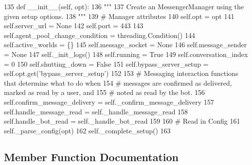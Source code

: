 \begin{DoxyCode}
135     \textcolor{keyword}{def }\_\_init\_\_(self, opt):
136         \textcolor{stringliteral}{"""}
137 \textcolor{stringliteral}{        Create an MessengerManager using the given setup options.}
138 \textcolor{stringliteral}{        """}
139         \textcolor{comment}{# Manager attributes}
140         self.opt = opt
141         self.server\_url = \textcolor{keywordtype}{None}
142         self.port = 443
143         self.agent\_pool\_change\_condition = threading.Condition()
144         self.active\_worlds = \{\}
145         self.message\_socket = \textcolor{keywordtype}{None}
146         self.message\_sender = \textcolor{keywordtype}{None}
147         self.\_init\_logs()
148         self.running = \textcolor{keyword}{True}
149         self.conversation\_index = 0
150         self.shutting\_down = \textcolor{keyword}{False}
151         self.bypass\_server\_setup = self.opt.get(\textcolor{stringliteral}{'bypass\_server\_setup'})
152 
153         \textcolor{comment}{# Messaging interaction functions that determine what to do when}
154         \textcolor{comment}{# messages are confirmed as delivered, marked as read by a user, and}
155         \textcolor{comment}{# noted as read by the bot.}
156         self.confirm\_message\_delivery = self.\_confirm\_message\_delivery
157         self.handle\_message\_read = self.\_handle\_message\_read
158         self.handle\_bot\_read = self.\_handle\_bot\_read
159 
160         \textcolor{comment}{# Read in Config}
161         self.\_parse\_config(opt)
162         self.\_complete\_setup()
163 
\end{DoxyCode}


\subsection{Member Function Documentation}
\mbox{\label{classparlai_1_1chat__service_1_1services_1_1messenger_1_1messenger__manager_1_1MessengerManager_ad67c90bbf632d7bd4e6c6109c89d7c14}} 
